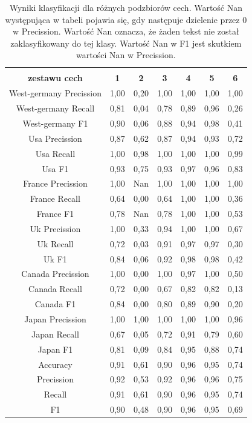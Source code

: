 \documentclass{classrep}
\begin{document}
\newpage
\begin{table}[h!]
\caption{Wyniki klasyfikacji dla różnych podzbiorów cech. Wartość Nan występująca w tabeli pojawia się, gdy następuje dzielenie przez 0 w Precission. Wartość Nan oznacza, że żaden tekst nie został zaklasyfikowany do tej klasy. Wartość Nan w F1 jest skutkiem wartości Nan w Precission.}
\centering
\vspace{0.1cm}
 \begin{tabular}{c c c c c c c}

    \makecell{\textbf{Wybrany numer} \\\textbf{zestawu cech}} & \textbf{1} & \textbf{2}  & \textbf{3}  & \textbf{4}  & \textbf{5} & \textbf{6}\\

\hline
West-germany Precission 	& 1,00 & 0,20 & 1,00 & 1,00 & 1,00 & 1,00\\
West-germany Recall 		& 0,81 & 0,04 & 0,78 & 0,89 & 0,96 & 0,26\\
West-germany F1		& 0,90 & 0,06 & 0,88 & 0,94 & 0,98 & 0,41\\
\hline
Usa Precission 			& 0,87 & 0,62 & 0,87 & 0,94 & 0,93 & 0,72\\
Usa Recall				& 1,00 & 0,98 & 1,00 & 1,00 & 1,00 & 0,99\\
Usa F1			 	& 0,93 & 0,75 & 0,93 & 0,97 & 0,96 & 0,83\\
\hline
France Precission 		& 1,00 & Nan & 1,00 & 1,00 & 1,00 & 1,00\\
France Recall 			& 0,64 & 0,00 & 0,64 & 1,00 & 1,00 & 0,36\\
France F1 				& 0,78 & Nan & 0,78 & 1,00 & 1,00 & 0,53\\
\hline
Uk Precission 			& 1,00 & 0,33 & 0,94 & 1,00 & 1,00 & 0,67\\
Uk Recall 				& 0,72 & 0,03 & 0,91 & 0,97 & 0,97 & 0,30\\
Uk F1 				& 0,84 & 0,06 & 0,92 & 0,98 & 0,98 & 0,42\\
\hline
Canada Precission		& 1,00 & 0,00 & 1,00 & 0,97 & 1,00 & 0,50\\
Canada Recall 			& 0,72 & 0,00 & 0,67 & 0,82 & 0,82 & 0,13\\
Canada F1 			& 0,84 & 0,00 & 0,80 & 0,89 & 0,90 & 0,20\\
\hline
Japan Precission 		& 1,00 & 1,00 & 1,00 & 1,00 & 1,00 & 0,96\\
Japan Recall 			& 0,67 & 0,05 & 0,72 & 0,91 & 0,79 & 0,60\\
Japan F1 				& 0,81 & 0,09 & 0,84 & 0,95 & 0,88 & 0,74\\
\hline
Accuracy 				& 0,91 & 0,61 & 0,90 & 0,96 & 0,95 & 0,74\\
Precission 				& 0,92 & 0,53 & 0,92 & 0,96 & 0,96 & 0,75\\
Recall 				& 0,91 & 0,61 & 0,90 & 0,96 & 0,95 & 0,74\\
F1 					& 0,90 & 0,48 & 0,90 & 0,96 & 0,95 & 0,69\\

\end {tabular}
\label {Wyniki klasyfikacji dla różnych podzbiorów cech.}
\end{table}
\end{document}
